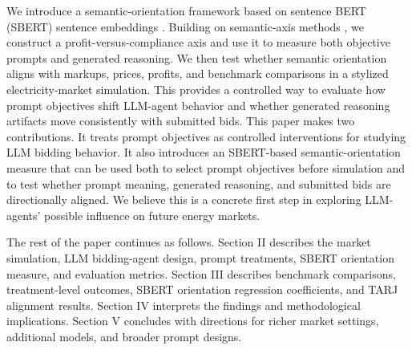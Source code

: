We introduce a semantic-orientation framework based on sentence BERT (SBERT) sentence embeddings \cite{reimers2019sentencebert}. Building on semantic-axis methods \cite{an2018semaxis,kozlowski2019geometry}, we construct a profit-versus-compliance axis and use it to measure both objective prompts and generated reasoning. We then test whether semantic orientation aligns with markups, prices, profits, and benchmark comparisons in a stylized electricity-market simulation. This provides a controlled way to evaluate how prompt objectives shift LLM-agent behavior and whether generated reasoning artifacts move consistently with submitted bids. This paper makes two contributions. It treats prompt objectives as controlled interventions for studying LLM bidding behavior. It also introduces an SBERT-based semantic-orientation measure that can be used both to select prompt objectives before simulation and to test whether prompt meaning, generated reasoning, and submitted bids are directionally aligned. We believe this is a concrete first step in exploring LLM-agents' possible influence on future energy markets.


The rest of the paper continues as follows. Section II describes the market simulation, LLM bidding-agent design, prompt treatments, SBERT orientation measure, and evaluation metrics. Section III describes benchmark comparisons, treatment-level outcomes, SBERT orientation regression coefficients, and TARJ alignment results. Section IV interprets the findings and methodological implications. Section V concludes with directions for richer market settings, additional models, and broader prompt designs.

